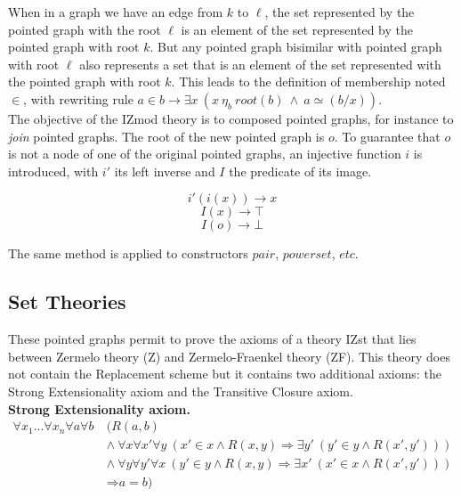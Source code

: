 \documentclass[submission,copyright,creativecommons]{eptcs}
\def\lra{\longrightarrow}
\def\imp{\mathbin{\Rightarrow}}
\def\fa{{\forall}}
\def\conj{\mathbin{\wedge}}
\def\ex{{\exists}}
\begin{document}
\begin{figure}[h]
\centering
{}
\end{figure}

When in a graph we have an edge from $k$ to $\ell$, the set represented by the pointed graph with the root $\ell$ is an element of the set represented by the pointed graph with root $k$. But any pointed graph bisimilar with pointed graph with root $\ell$ also represents a set that is an element of the set represented with the pointed graph with root $k$. This leads to the definition of membership noted $\in$, with rewriting rule $a \in b \lra \ex x~(x~\eta_b~root(b)~\conj~a \simeq (b/x))$. \\

The objective of the IZmod theory is to composed pointed graphs, for instance to \textit{join} pointed graphs. The root of the new pointed graph is $o$. To guarantee that $o$ is not a node of one of the original pointed graphs, an injective function $i$ is introduced, with $i'$ its left inverse and $I$ the predicate of its image. 

$$i'(i(x)) \lra x$$
$$I(x) \lra \top$$
$$I(o) \lra \bot$$

The same method is applied to constructors $pair$, $powerset$, $etc$.

\subsection{Set Theories}

These pointed graphs permit to prove the axioms of a theory IZst that lies between Zermelo theory (Z) and Zermelo-Fraenkel theory (ZF). This theory does not contain the Replacement scheme but it contains two additional axioms: the Strong Extensionality axiom and the Transitive Closure axiom. \\

\textbf{Strong Extensionality axiom.} 
\begin{equation*}
\begin{split}
\fa x_1...\fa x_n\fa a\fa b~ &(R(a, b) \\
&\conj~\fa x\fa x'\fa y~(x' \in x \conj R(x, y) \imp \ex y'~(y' \in y \conj R(x', y'))) \\
&\conj~\fa y\fa y'\fa x~(y' \in y \conj R(x, y) \imp \ex x'~(x' \in x \conj R(x', y'))) \\
&\imp a = b) 
\end{split}
\end{equation*}
\end{document}
